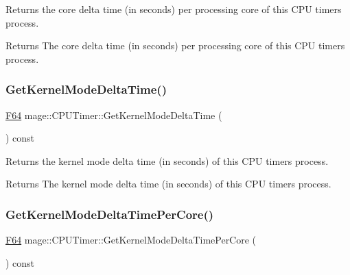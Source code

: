 Returns the core delta time (in seconds) per processing core of this C\+PU timer\textquotesingle{}s process.

\begin{DoxyReturn}{Returns}
The core delta time (in seconds) per processing core of this C\+PU timer\textquotesingle{}s process. 
\end{DoxyReturn}
\hypertarget{classmage_1_1_c_p_u_timer_a806439a1ca61d81c877e9823b9cb0705}{}\label{classmage_1_1_c_p_u_timer_a806439a1ca61d81c877e9823b9cb0705} 
\subsubsection{\texorpdfstring{Get\+Kernel\+Mode\+Delta\+Time()}{GetKernelModeDeltaTime()}}
{\footnotesize\ttfamily \hyperlink{namespacemage_ad26233bbec640deda836e572c1a23708}{F64} mage\+::\+C\+P\+U\+Timer\+::\+Get\+Kernel\+Mode\+Delta\+Time (\begin{DoxyParamCaption}{ }\end{DoxyParamCaption}) const\hspace{0.3cm}{\ttfamily [noexcept]}}

Returns the kernel mode delta time (in seconds) of this C\+PU timer\textquotesingle{}s process.

\begin{DoxyReturn}{Returns}
The kernel mode delta time (in seconds) of this C\+PU timer\textquotesingle{}s process. 
\end{DoxyReturn}
\hypertarget{classmage_1_1_c_p_u_timer_a7c503d9d66548e74ea29d887ee1ddcd3}{}\label{classmage_1_1_c_p_u_timer_a7c503d9d66548e74ea29d887ee1ddcd3} 
\subsubsection{\texorpdfstring{Get\+Kernel\+Mode\+Delta\+Time\+Per\+Core()}{GetKernelModeDeltaTimePerCore()}}
{\footnotesize\ttfamily \hyperlink{namespacemage_ad26233bbec640deda836e572c1a23708}{F64} mage\+::\+C\+P\+U\+Timer\+::\+Get\+Kernel\+Mode\+Delta\+Time\+Per\+Core (\begin{DoxyParamCaption}{ }\end{DoxyParamCaption}) const\hspace{0.3cm}{\ttfamily [noexcept]}}

